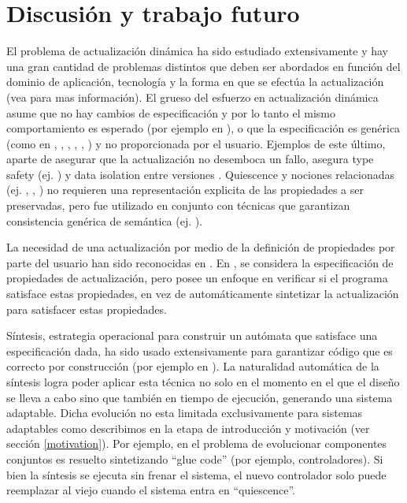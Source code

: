 \section{Discusión y trabajo futuro}

El problema de actualización dinámica ha sido estudiado extensivamente y hay una gran cantidad de problemas distintos
que deben ser abordados en función del dominio de aplicación, tecnología y la forma en que se efectúa la actualización
(vea \cite{SMR:SMR1556} para mas información). El grueso del esfuerzo en actualización dinámica asume que no hay cambios
de especificación y por lo tanto el mismo comportamiento es esperado (por ejemplo en \cite{mx:icse13}), o que la
especificación es genérica (como en \cite{Shen:2005:TUF:1095430.1081720}, \cite{5551162}, \cite{1167829},
\cite{4221625}, \cite{485222}, \cite{60317}) y no proporcionada por el usuario. Ejemplos de este último, aparte de
asegurar que la actualización no desemboca un fallo, asegura type safety (ej. \cite{Subramanian08dynamicsoftware}) y
data isolation entre versiones \cite{Stoyle07mutatismutandis:}. Quiescence \cite{60317} y nociones relacionadas (ej.
\cite{4359466},  \cite{Anderson:2009:MPM:1656437.1656448}, \cite{485222}) no requieren una representación explicita de
las propiedades a ser preservadas, pero fue utilizado en conjunto con técnicas que garantizan consistencia genérica de
semántica (ej. \cite{5546542}). 

La necesidad de una actualización por medio de la definición de propiedades por parte del usuario han sido reconocidas
en \cite{Baresi:2010:DBD:1882362.1882367}. En \cite{Hayden:2012:SVC:2189314.2189336}, se considera la especificación de
propiedades de actualización, pero posee un enfoque en verificar si el programa satisface estas propiedades, en vez de
automáticamente sintetizar la actualización para satisfacer estas propiedades. 

Síntesis, estrategia operacional para construir un autómata que satisface una especificación dada, ha sido usado
extensivamente para garantizar código que es correcto por construcción (por ejemplo en
\cite{Greenyer:2013:ISC:2491411.2491445}). La naturalidad automática de la síntesis logra poder aplicar esta técnica no
solo en el momento en el que el diseño se lleva a cabo sino que también en tiempo de ejecución, generando una sistema
adaptable. Dicha evolución no esta limitada exclusivamente para sistemas adaptables como describimos en la etapa de
introducción y motivación (ver sección \ref{motivation}). Por ejemplo, en \cite{Pelliccione20082237} el problema de
evolucionar componentes conjuntos es resuelto sintetizando ``glue code'' (por ejemplo, controladores). Si bien la
síntesis se ejecuta sin frenar el sistema, el nuevo controlador solo puede reemplazar al viejo cuando el sistema entra
en ``quiescence''.

